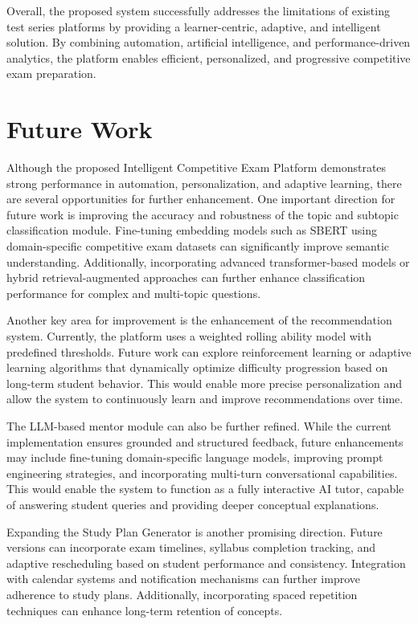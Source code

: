 \begin{sloppypar}
Overall, the proposed system successfully addresses the limitations of existing test series platforms by providing a learner-centric, adaptive, and intelligent solution. By combining automation, artificial intelligence, and performance-driven analytics, the platform enables efficient, personalized, and progressive competitive exam preparation.

\section{Future Work}

Although the proposed Intelligent Competitive Exam Platform demonstrates strong performance in automation, personalization, and adaptive learning, there are several opportunities for further enhancement. One important direction for future work is improving the accuracy and robustness of the topic and subtopic classification module. Fine-tuning embedding models such as SBERT using domain-specific competitive exam datasets can significantly improve semantic understanding. Additionally, incorporating advanced transformer-based models or hybrid retrieval-augmented approaches can further enhance classification performance for complex and multi-topic questions.

Another key area for improvement is the enhancement of the recommendation system. Currently, the platform uses a weighted rolling ability model with predefined thresholds. Future work can explore reinforcement learning or adaptive learning algorithms that dynamically optimize difficulty progression based on long-term student behavior. This would enable more precise personalization and allow the system to continuously learn and improve recommendations over time.

The LLM-based mentor module can also be further refined. While the current implementation ensures grounded and structured feedback, future enhancements may include fine-tuning domain-specific language models, improving prompt engineering strategies, and incorporating multi-turn conversational capabilities. This would enable the system to function as a fully interactive AI tutor, capable of answering student queries and providing deeper conceptual explanations.

Expanding the Study Plan Generator is another promising direction. Future versions can incorporate exam timelines, syllabus completion tracking, and adaptive rescheduling based on student performance and consistency. Integration with calendar systems and notification mechanisms can further improve adherence to study plans. Additionally, incorporating spaced repetition techniques can enhance long-term retention of concepts.


\end{sloppypar}

